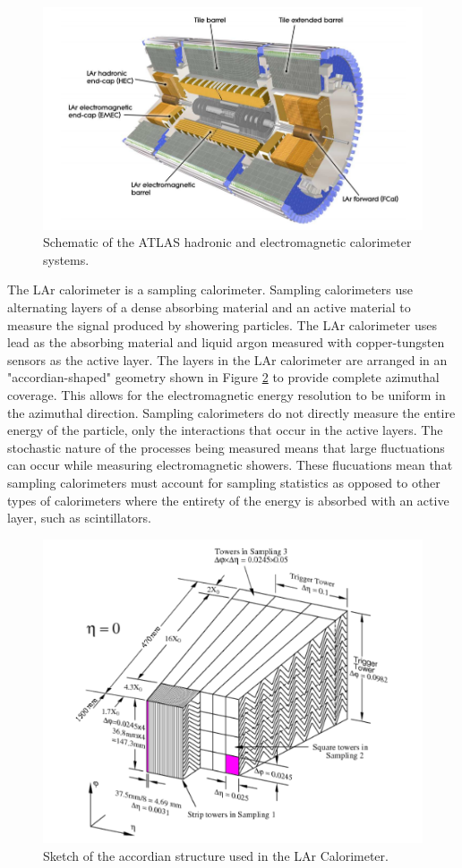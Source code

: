 \begin{figure}[ht!]
	\centering
	\includegraphics[width=\columnwidth]{../ThesisImages/LHCImages/ATLASCaloSystem.png}
	\caption[Schematic of the ATLAS hadronic and electromagnetic calorimeter systems.]{Schematic of the ATLAS hadronic and electromagnetic calorimeter systems\cite{ATLAS}.
	}
	\label{fig:ATLASCaloSys}
\end{figure}

The LAr calorimeter is a sampling calorimeter.  Sampling calorimeters use alternating layers of a dense absorbing material and an active material to measure the signal produced by showering particles.  The LAr calorimeter uses lead as the absorbing material and liquid argon measured with copper-tungsten sensors as the active layer.  The layers in the LAr calorimeter are arranged in an "accordian-shaped" geometry shown in Figure \ref{fig:LArAccordian} to provide complete azimuthal coverage.  This allows for the electromagnetic energy resolution to be uniform in the azimuthal direction.  Sampling calorimeters do not directly measure the entire energy of the particle, only the interactions that occur in the active layers. The stochastic nature of the processes being measured means that large fluctuations can occur while measuring electromagnetic showers.  These flucuations mean that sampling calorimeters must account for sampling statistics as opposed to other types of calorimeters where the entirety of the energy is absorbed with an active layer, such as scintillators.  
\begin{figure}[ht!]
	\centering
	\includegraphics[width=0.5\columnwidth]{../ThesisImages/LHCImages/LArAccordian.png}
	\caption[Sketch of the accordian structure used in the LAr Calorimeter.]{Sketch of the accordian structure used in the LAr Calorimeter\cite{CERN-LHCC-96-041}.
	}
	\label{fig:LArAccordian}
\end{figure}

